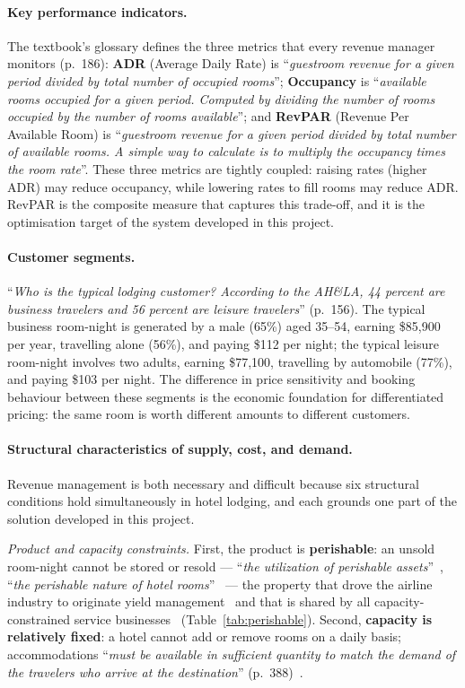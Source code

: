 \paragraph{Key performance indicators.}
The textbook's glossary defines the three metrics that every revenue manager monitors (p.~186): \textbf{ADR} (Average Daily Rate) is ``\emph{guestroom revenue for a given period divided by total number of occupied rooms}''; \textbf{Occupancy} is ``\emph{available rooms occupied for a given period. Computed by dividing the number of rooms occupied by the number of rooms available}''; and \textbf{RevPAR} (Revenue Per Available Room) is ``\emph{guestroom revenue for a given period divided by total number of available rooms. A simple way to calculate is to multiply the occupancy times the room rate}''. These three metrics are tightly coupled: raising rates (higher ADR) may reduce occupancy, while lowering rates to fill rooms may reduce ADR. RevPAR is the composite measure that captures this trade-off, and it is the optimisation target of the system developed in this project.

\paragraph{Customer segments.}
``\emph{Who is the typical lodging customer? According to the AH\&LA, 44 percent are business travelers and 56 percent are leisure travelers}'' (p.~156). The typical business room-night is generated by a male (65\%) aged 35--54, earning \$85{,}900 per year, travelling alone (56\%), and paying \$112 per night; the typical leisure room-night involves two adults, earning \$77{,}100, travelling by automobile (77\%), and paying \$103 per night. The difference in price sensitivity and booking behaviour between these segments is the economic foundation for differentiated pricing: the same room is worth different amounts to different customers.

\paragraph{Structural characteristics of supply, cost, and demand.}
Revenue management is both necessary and difficult because six structural conditions hold simultaneously in hotel lodging, and each grounds one part of the solution developed in this project.

\emph{Product and capacity constraints.} First, the product is \textbf{perishable}: an unsold room-night cannot be stored or resold --- ``\emph{the utilization of perishable assets}''~\cite{mcgill1999}, ``\emph{the perishable nature of hotel rooms}''~\cite{amadeus2023} --- the property that drove the airline industry to originate yield management~\cite{rothstein1971} and that is shared by all capacity-constrained service businesses~\cite{kimes1989} (Table~\ref{tab:perishable}). Second, \textbf{capacity is relatively fixed}: a hotel cannot add or remove rooms on a daily basis; accommodations ``\emph{must be available in sufficient quantity to match the demand of the travelers who arrive at the destination}'' (p.~388)~\cite{goeldner2009}.

